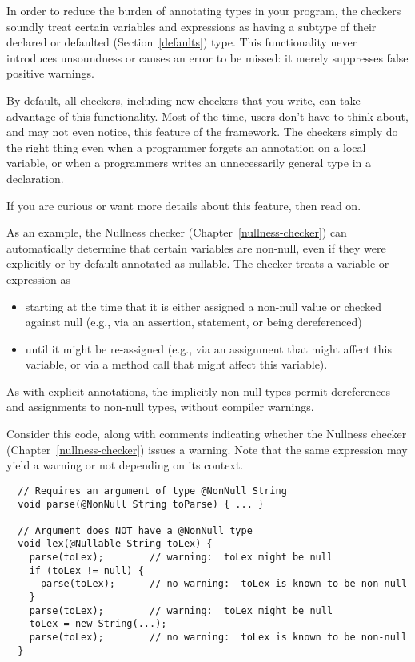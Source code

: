 In order to reduce the burden of annotating types in your program, the
checkers soundly treat certain variables and expressions as having a
subtype of their declared or defaulted (Section~\ref{defaults})
type.  This functionality
never introduces unsoundness or causes an error to be missed:  it merely
suppresses false positive warnings.

By default, all checkers, including new checkers that you write, can take
advantage of this functionality.  Most of the time, users don't have to
think about, and may not even notice, this feature of the framework.  The
checkers simply do the right thing even when a programmer forgets an
annotation on a local variable, or when a programmers writes an
unnecessarily general type in a declaration.

If you are curious or want more details about this feature, then read on.

As an example, the Nullness checker (Chapter~\ref{nullness-checker}) can automatically
determine that certain variables are non-null, even if they were explicitly
or by default annotated as nullable.
The checker treats a variable or expression as 
\begin{itemize}
\item
starting at the time that it is either
assigned a non-null value or checked against null (e.g., via an assertion,
 statement, or being dereferenced)
\item
until it might be re-assigned (e.g.,
via an assignment that might affect this variable, or via a method call
that might affect this variable).
\end{itemize}

As with explicit annotations, the implicitly non-null types permit
dereferences and assignments to non-null types, without
compiler warnings.

Consider this code, along with comments indicating whether the
Nullness checker (Chapter~\ref{nullness-checker}) issues a warning.  Note that the same expression may yield a
warning or not depending on its context.

\begin{Verbatim}
  // Requires an argument of type @NonNull String
  void parse(@NonNull String toParse) { ... }

  // Argument does NOT have a @NonNull type
  void lex(@Nullable String toLex) {
    parse(toLex);        // warning:  toLex might be null
    if (toLex != null) {
      parse(toLex);      // no warning:  toLex is known to be non-null
    }
    parse(toLex);        // warning:  toLex might be null
    toLex = new String(...);
    parse(toLex);        // no warning:  toLex is known to be non-null
  }
\end{Verbatim}

